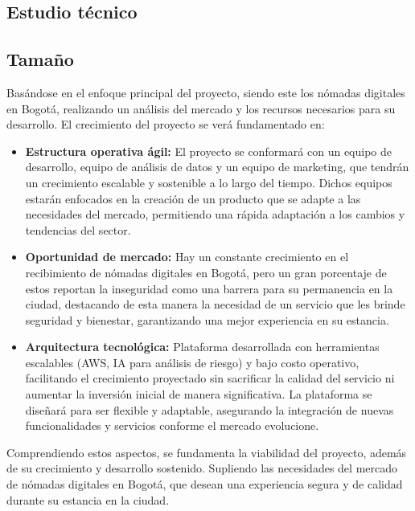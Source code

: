 \subsection{Estudio técnico}
\subsection{Tamaño}
Basándose en el enfoque principal del proyecto, siendo este los nómadas digitales en Bogotá, realizando un análisis del mercado y los recursos necesarios para su desarrollo. El crecimiento del proyecto se verá fundamentado en:

\begin{itemize}
    \item \textbf{Estructura operativa ágil:} El proyecto se conformará con un equipo de desarrollo, equipo de análisis de datos y un equipo de marketing, que tendrán un crecimiento escalable y sostenible a lo largo del tiempo. Dichos equipos estarán enfocados en la creación de un producto que se adapte a las necesidades del mercado, permitiendo una rápida adaptación a los cambios y tendencias del sector.
    \item \textbf{Oportunidad de mercado:} Hay un constante crecimiento en el recibimiento de nómadas digitales en Bogotá, pero un gran porcentaje de estos reportan la inseguridad como una barrera para su permanencia en la ciudad, destacando de esta manera la necesidad de un servicio que les brinde seguridad y bienestar, garantizando una mejor experiencia en su estancia.
    \item \textbf{Arquitectura tecnológica:} Plataforma desarrollada con herramientas escalables (AWS, IA para análisis de riesgo) y bajo costo operativo, facilitando el crecimiento proyectado sin sacrificar la calidad del servicio ni aumentar la inversión inicial de manera significativa. La plataforma se diseñará para ser flexible y adaptable, asegurando la integración de nuevas funcionalidades y servicios conforme el mercado evolucione.
\end{itemize}

Comprendiendo estos aspectos, se fundamenta la viabilidad del proyecto, además de su crecimiento y desarrollo sostenido. Supliendo las necesidades del mercado de nómadas digitales en Bogotá, que desean una experiencia segura y de calidad durante su estancia en la ciudad.

